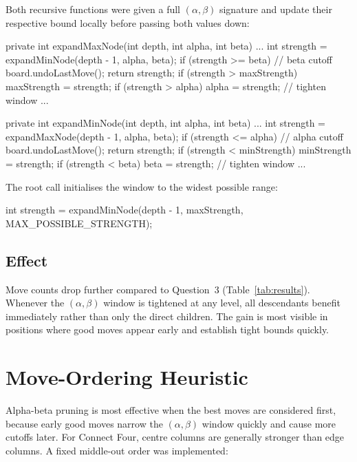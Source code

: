 \documentclass[language=english,titlepage=false,smartquotes=true]{hgbreport}
\begin{document}
Both recursive functions were given a full $(\alpha, \beta)$ signature and
update their respective bound locally before passing both values down:

\begin{JavaCode}[numbers=none]
private int expandMaxNode(int depth, int alpha, int beta) {
    ...
    int strength = expandMinNode(depth - 1, alpha, beta);
    if (strength >= beta) {          // beta cutoff
        board.undoLastMove();
        return strength;
    }
    if (strength > maxStrength) maxStrength = strength;
    if (strength > alpha) alpha = strength;  // tighten window
    ...
}

private int expandMinNode(int depth, int alpha, int beta) {
    ...
    int strength = expandMaxNode(depth - 1, alpha, beta);
    if (strength <= alpha) {         // alpha cutoff
        board.undoLastMove();
        return strength;
    }
    if (strength < minStrength) minStrength = strength;
    if (strength < beta) beta = strength;    // tighten window
    ...
}
\end{JavaCode}

The root call initialises the window to the widest possible range:
\begin{JavaCode}[numbers=none]
int strength = expandMinNode(depth - 1, maxStrength, MAX_POSSIBLE_STRENGTH);
\end{JavaCode}

\subsection{Effect}

Move counts drop further compared to Question~3 (Table~\ref{tab:results}).
Whenever the $(\alpha, \beta)$ window is tightened at any level, all
descendants benefit immediately rather than only the direct children.
The gain is most visible in positions where good moves appear early and
establish tight bounds quickly.

\section{Move-Ordering Heuristic}

Alpha-beta pruning is most effective when the best moves are considered first,
because early good moves narrow the $(\alpha, \beta)$ window quickly and cause
more cutoffs later. For Connect Four, centre columns are generally stronger
than edge columns. A fixed middle-out order was implemented:
\end{document}
